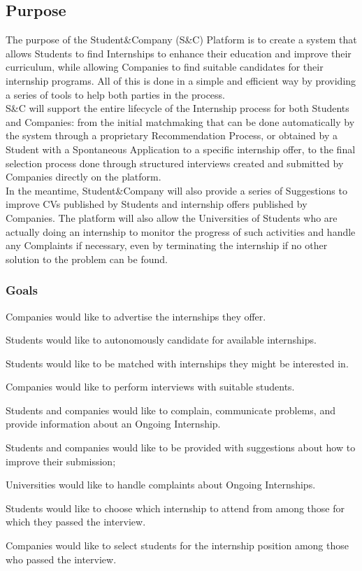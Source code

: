 \subsection{Purpose}
The purpose of the Student\&Company (S\&C) Platform is to create a system that allows Students to find Internships to enhance their education and improve their curriculum, while allowing Companies to find suitable candidates for their internship programs. All of this is done in a simple and efficient way by providing a series of tools to help both parties in the process.\\
S\&C will support the entire lifecycle of the Internship process for both Students and Companies: from the initial matchmaking that can be done automatically by the system through a proprietary Recommendation Process, or obtained by a Student with a Spontaneous Application to a specific internship offer, to the final selection process done through structured interviews created and submitted by Companies directly on the platform.\\%
In the meantime, Student\&Company will also provide a series of Suggestions to improve CVs published by Students and internship offers published by Companies. The platform will also allow the Universities of Students who are actually doing an internship to monitor the progress of such activities and handle any Complaints if necessary, even by terminating the internship if no other solution to the problem can be found.
\subsubsection{Goals}
\begin{enumerate}[label={\color{titleColor}[G\arabic*]}]
\item Companies would like to advertise the internships they offer.
\item Students would like to autonomously candidate for available internships.
\item Students would like to be matched with internships they might be interested in.
\item Companies would like to perform interviews with suitable students.
\item Students and companies would like to complain, communicate problems, and provide information about an Ongoing Internship.
\item Students and companies would like to be provided with suggestions about how to improve their submission;
\item Universities would like to handle complaints about Ongoing Internships.
\item Students would like to choose which internship to attend from among those for which they passed the interview.
\item Companies would like to select students for the internship position among those who passed the interview.
 
\end{enumerate}


